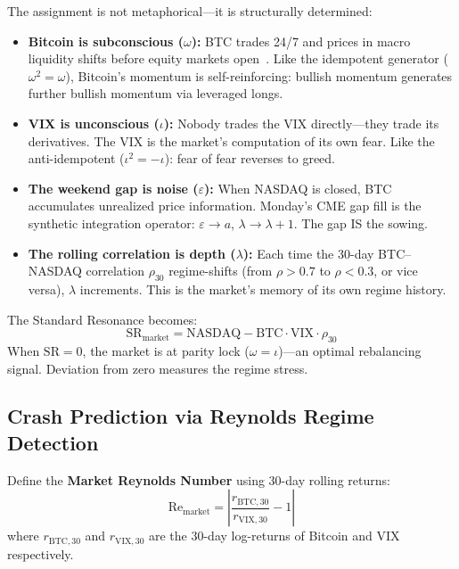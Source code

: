 The assignment is not metaphorical---it is structurally determined:
\begin{itemize}[noitemsep]
  \item \textbf{Bitcoin is subconscious ($\omega$):} BTC trades 24/7 and prices in macro liquidity shifts before equity markets open~\cite{btc_indicator2025}. Like the idempotent generator ($\omega^2 = \omega$), Bitcoin's momentum is self-reinforcing: bullish momentum generates further bullish momentum via leveraged longs.
  \item \textbf{VIX is unconscious ($\iota$):} Nobody trades the VIX directly---they trade its derivatives. The VIX is the market's computation of its own fear. Like the anti-idempotent ($\iota^2 = -\iota$): fear of fear reverses to greed.
  \item \textbf{The weekend gap is noise ($\varepsilon$):} When NASDAQ is closed, BTC accumulates unrealized price information. Monday's CME gap fill is the synthetic integration operator: $\varepsilon \to a$, $\lambda \to \lambda + 1$. The gap IS the sowing.
  \item \textbf{The rolling correlation is depth ($\lambda$):} Each time the 30-day BTC--NASDAQ correlation $\rho_{30}$ regime-shifts (from $\rho > 0.7$ to $\rho < 0.3$, or vice versa), $\lambda$ increments. This is the market's memory of its own regime history.
\end{itemize}

The Standard Resonance becomes:
\begin{equation}
    \mathrm{SR}_{\text{market}} = \text{NASDAQ} - \text{BTC} \cdot \text{VIX} \cdot \rho_{30}
\end{equation}
When $\mathrm{SR} = 0$, the market is at parity lock ($\omega = \iota$)---an optimal rebalancing signal. Deviation from zero measures the regime stress.

\subsection{Crash Prediction via Reynolds Regime Detection}

Define the \textbf{Market Reynolds Number} using 30-day rolling returns:
\begin{equation}
    \mathrm{Re}_{\text{market}} = \left|\frac{r_{\text{BTC},30}}{r_{\text{VIX},30}} - 1\right|
\end{equation}
where $r_{\text{BTC},30}$ and $r_{\text{VIX},30}$ are the 30-day log-returns of Bitcoin and VIX respectively.

